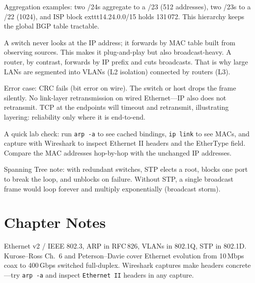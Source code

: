 Aggregation examples: two /24s aggregate to a /23 (512 addresses), two /23s to a /22 (1024), and ISP block 	exttt{14.24.0.0/15} holds 131\,072. This hierarchy keeps the global BGP table tractable.

\begin{remark}
A switch never looks at the IP address; it forwards by MAC table built from observing sources.
This makes it plug-and-play but also broadcast-heavy. A router, by contrast, forwards by IP prefix and cuts broadcasts.
That is why large LANs are segmented into VLANs (L2 isolation) connected by routers (L3).
\end{remark}

Error case: CRC fails (bit error on wire). The switch or host drops the frame silently. No link-layer retransmission on wired Ethernet---IP also does not retransmit. TCP at the endpoints will timeout and retransmit, illustrating layering: reliability only where it is end-to-end.


A quick lab check: run \texttt{arp -a} to see cached bindings, \texttt{ip link} to see MACs, and capture with Wireshark to inspect Ethernet II headers and the EtherType field. Compare the MAC addresses hop-by-hop with the unchanged IP addresses.

Spanning Tree note: with redundant switches, STP elects a root, blocks one port to break the loop, and unblocks on failure. Without STP, a single broadcast frame would loop forever and multiply exponentially (broadcast storm).

\section{Chapter Notes}
Ethernet v2 / IEEE 802.3, ARP in RFC\,826, VLANs in 802.1Q, STP in 802.1D. Kurose--Ross Ch.~6 and Peterson--Davie cover Ethernet evolution from 10\,Mbps coax to 400\,Gbps switched full-duplex. Wireshark captures make headers concrete---try \texttt{arp -a} and inspect \texttt{Ethernet II} headers in any capture.
